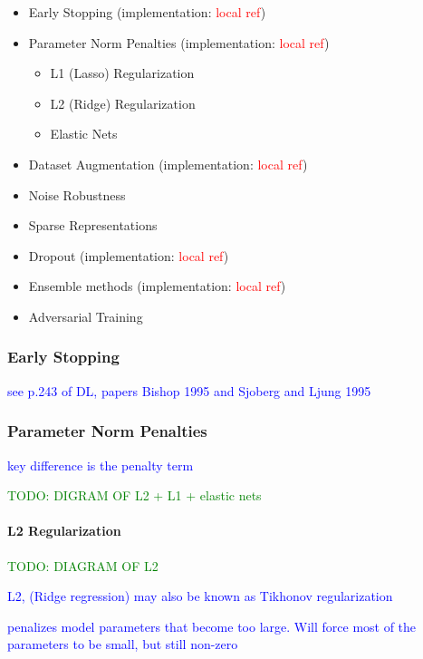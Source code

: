 \begin{itemize}
	\item Early Stopping (implementation: \textcolor{red}{local ref})
	\item Parameter Norm Penalties (implementation: \textcolor{red}{local ref})
	\begin{itemize}
		\item L1 (Lasso) Regularization
		\item L2 (Ridge) Regularization
		\item Elastic Nets
	\end{itemize}
	\item Dataset Augmentation (implementation: \textcolor{red}{local ref})
	\item Noise Robustness
	\item Sparse Representations
	\item Dropout (implementation: \textcolor{red}{local ref})
	\item Ensemble methods (implementation: \textcolor{red}{local ref})
	\item Adversarial Training
\end{itemize}


\subsubsection{Early Stopping}

\textcolor{blue}{see p.243 of DL, papers Bishop 1995 and Sjoberg and Ljung 1995}


\subsubsection{Parameter Norm Penalties}

\textcolor{blue}{key difference is the penalty term}

\textcolor{green}{TODO: DIGRAM OF L2 + L1 + elastic nets}

\paragraph{L2 Regularization}

\textcolor{green}{TODO: DIAGRAM OF L2}

\textcolor{blue}{L2, ({Ridge regression}) may also be known as {Tikhonov regularization}}

\textcolor{blue}{penalizes model parameters that become too large. Will force most of the parameters to be small, but still non-zero}

